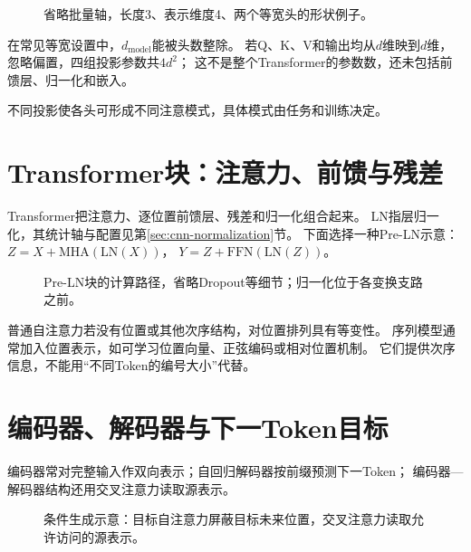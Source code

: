 \begin{figure}[htbp]
\centering
\caption{省略批量轴，长度3、表示维度4、两个等宽头的形状例子。}
\par\smallskip
{}
\end{figure}

在常见等宽设置中，$d_{\mathrm{model}}$能被头数整除。
若Q、K、V和输出均从$d$维映到$d$维，忽略偏置，四组投影参数共$4d^2$；
这不是整个Transformer的参数数，还未包括前馈层、归一化和嵌入。

不同投影使各头可形成不同注意模式，具体模式由任务和训练决定。

\section{Transformer块：注意力、前馈与残差}
\label{sec:seq-transformer}
Transformer把注意力、逐位置前馈层、残差和归一化组合起来。
LN指层归一化，其统计轴与配置见第\ref{sec:cnn-normalization}节。
下面选择一种Pre-LN示意：
$Z=X+\mathrm{MHA}(\mathrm{LN}(X))$，
$Y=Z+\mathrm{FFN}(\mathrm{LN}(Z))$。

\begin{figure}[htbp]
\centering
\caption{Pre-LN块的计算路径，省略Dropout等细节；归一化位于各变换支路之前。}
\par\smallskip
{}
\end{figure}

普通自注意力若没有位置或其他次序结构，对位置排列具有等变性。
序列模型通常加入位置表示，如可学习位置向量、正弦编码或相对位置机制。
它们提供次序信息，不能用“不同Token的编号大小”代替。

\section{编码器、解码器与下一Token目标}
\label{sec:seq-encoder-decoder}
编码器常对完整输入作双向表示；自回归解码器按前缀预测下一Token；
编码器—解码器结构还用交叉注意力读取源表示。

\begin{figure}[htbp]
\centering
\caption{条件生成示意：目标自注意力屏蔽目标未来位置，交叉注意力读取允许访问的源表示。}
\par\smallskip
{}
\end{figure}

